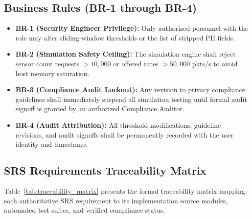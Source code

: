 \documentclass[a4paper]{article}
\begin{document}
\subsection{Business Rules (BR-1 through BR-4)}
\begin{itemize}
    \item \textbf{BR-1 (Security Engineer Privilege):} Only authorized personnel with the  role may alter sliding-window thresholds or the list of stripped PII fields.
    \item \textbf{BR-2 (Simulation Safety Ceiling):} The simulation engine shall reject sensor count requests $> 10,000$ or offered rates $> 50,000$ pkts/s to avoid host memory saturation.
    \item \textbf{BR-3 (Compliance Audit Lockout):} Any revision to privacy compliance guidelines shall immediately suspend all simulation testing until formal audit signoff is granted by an authorized Compliance Auditor.
    \item \textbf{BR-4 (Audit Attribution):} All threshold modifications, guideline revisions, and audit signoffs shall be permanently recorded with the user identity and timestamp.
\end{itemize}

\subsection{SRS Requirements Traceability Matrix}
Table~\ref{tab:traceability_matrix} presents the formal traceability matrix mapping each authoritative SRS requirement to its implementation source modules, automated test suites, and verified compliance status.
\end{document}
